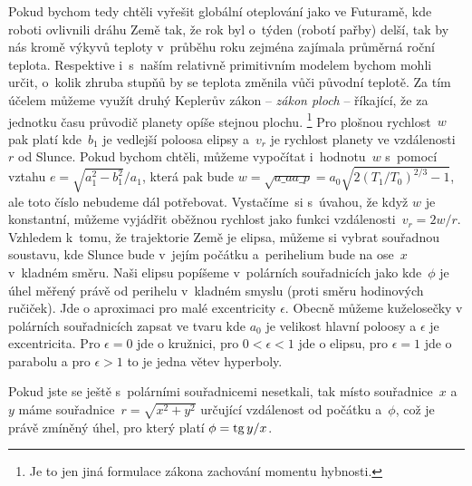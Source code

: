 \documentclass[twoside,fykos]{fksserie}
\begin{document}
Pokud bychom tedy chtěli vyřešit globální oteplování jako ve Futuramě,
kde roboti ovlivnili dráhu Země tak, že rok byl o~týden (robotí pařby)
delší, tak by nás kromě výkyvů teploty v~průběhu roku zejména zajímala
průměrná roční teplota. Respektive i~s~naším relativně primitivním modelem
bychom mohli určit, o~kolik zhruba stupňů by se teplota změnila vůči 
původní teplotě. Za tím účelem můžeme využít druhý Keplerův zákon -- {\it zákon
ploch} -- říkající, že za jednotku času průvodič planety opíše stejnou plochu.%
\footnote{Je to jen jiná formulace zákona zachování momentu hybnosti.}
Pro plošnou rychlost~$w$ pak platí
kde~$b_1$ je vedlejší poloosa elipsy a~$v_r$ je rychlost planety ve 
vzdálenosti~$r$ od Slunce. Pokud bychom chtěli, můžeme vypočítat
i~hodnotu~$w$ s~pomocí vztahu $e = {\sqrt{a_1^2 - b_1^2}}/{a_1}$, 
která pak bude $w = \sqrt{a\_a a\_p} = a_0 
\sqrt{2 \left( {T_1}/{T_0} \right) ^{2/3} -1 }$, ale toto číslo
nebudeme dál potřebovat. Vystačíme~si s~úvahou, že když $w$ je 
konstantní, můžeme vyjádřit oběžnou rychlost jako funkci vzdálenosti~$v_r =
{2w}/{r}$.
Vzhledem k~tomu, že trajektorie Země je elipsa,
můžeme si vybrat souřadnou soustavu, kde Slunce bude v~jejím počátku
a~perihelium bude na ose~$x$ v~kladném směru. Naši elipsu popíšeme v~polárních 
souřadnicích jako 
kde~$\phi$ je úhel měřený právě od perihelu v~kladném smyslu (proti směru 
hodinových ručiček). Jde o aproximaci pro malé excentricity $\epsilon$. 
Obecně můžeme kuželosečky v polárních souřadnicích zapsat ve tvaru 
kde $a_0$ je velikost hlavní poloosy a $\epsilon$ je excentricita. Pro 
$\epsilon=0$ jde o kružnici, pro $0<\epsilon<1$ jde o elipsu, pro 
$\epsilon=1$ jde o parabolu a pro $\epsilon>1$ to je jedna větev hyperboly.

Pokud jste se ještě s~polárními souřadnicemi nesetkali,
tak místo souřadnice~$x$ a~$y$ máme souřadnice~$r = \sqrt{x^2 + y^2}$ 
určující vzdálenost od počátku a~$\phi$, což je právě zmíněný úhel, pro
který platí $\phi = \mathop\mathrm{tg}\nolimits {y}/{x}$.
\end{document}
